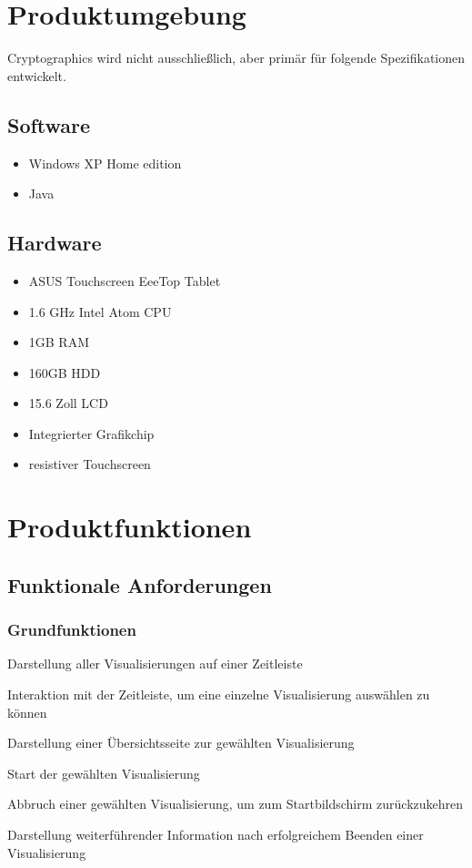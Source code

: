 \documentclass{article}
\begin{document}
\section{Produktumgebung}

Cryptographics wird nicht ausschließlich, aber primär für folgende Spezifikationen entwickelt.

\subsection{Software}

\begin{itemize}[label={}]
	\item Windows XP Home edition
	\item Java
\end{itemize}

\subsection{Hardware}

\begin{itemize}[label={}]
	\item ASUS Touchscreen EeeTop Tablet
	\item 1.6 GHz Intel Atom CPU
	\item 1GB RAM
	\item 160GB HDD
	\item 15.6 Zoll LCD
	\item Integrierter Grafikchip
	\item resistiver Touchscreen
\end{itemize}

\section{Produktfunktionen}

\subsection{Funktionale Anforderungen}

\subsubsection{Grundfunktionen}

\begin{FA}[start=100]
\item Darstellung aller Visualisierungen auf einer Zeitleiste
\item Interaktion mit der Zeitleiste, um eine einzelne Visualisierung auswählen zu können
\item Darstellung einer Übersichtsseite zur gewählten Visualisierung
\item Start der gewählten Visualisierung
\item Abbruch einer gewählten Visualisierung, um zum Startbildschirm zurückzukehren
\item Darstellung weiterführender Information nach erfolgreichem Beenden einer Visualisierung
\end{FA}
\end{document}
